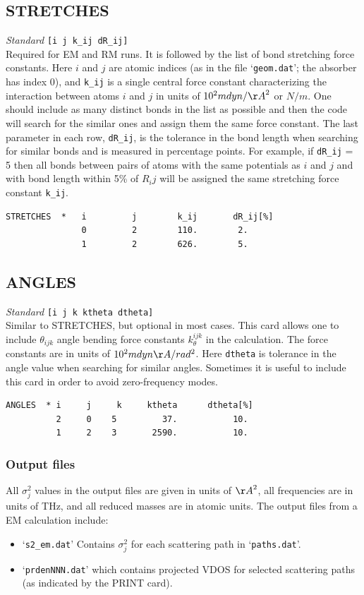 \documentclass[11pt,oneside]{report} %
\newenvironment{Card}[4]%
      {\vspace{3ex}%
        \subsection{#1}
        \quad\textsl{#3}\newline
        \quad\texttt{#2}\newline%
        \label{card:#4}\\}
      {}
\newcommand{\file}[1]{`\texttt{#1}'}
\begin{document}
\begin{Card}{STRETCHES}{[i   j   k\_ij   dR\_ij]}{Standard}{spring-stretches}
  Required for EM and RM runs.  It is followed by the list of bond stretching force constants.  Here $i$ and $j$ are atomic indices (as in the file \file{geom.dat}; the absorber has index 0), and \texttt{k\_ij} is a single central force constant characterizing the interaction between atoms $i$ and $j$ in units of $10^2 mdyn/{\AA}^2$ or $N/m$.  One should include as many distinct bonds in the list as possible and then the code will search for the similar ones and assign them the same force constant.  The last parameter in each row, \texttt{dR\_ij}, is the tolerance in the bond length when searching for similar bonds and is measured in percentage points.  For example, if \texttt{dR\_ij} = 5 then all bonds between pairs of atoms with the same potentials as $i$ and $j$ and with bond length within 5\% of $R_ij$ will be assigned the same stretching force constant \texttt{k\_ij}.
\begin{verbatim}
STRETCHES  *   i         j        k_ij       dR_ij[%]
               0         2        110.        2.
               1         2        626.        5.
\end{verbatim}
\end{Card}


\begin{Card}{ANGLES}{[i   j   k    ktheta   dtheta]}{Standard}{spring-angles}
  Similar to STRETCHES, but optional in most cases.  This card allows one to include $\theta_{ijk}$ angle bending force constants $k_{\theta}^{ijk}$ in the calculation.  The force constants are in units of $10^2 mdyn \AA / rad^2$.  Here \texttt{dtheta} is tolerance in the angle value when searching for similar angles.  Sometimes it is useful to include this card in order to avoid zero-frequency modes. 
\begin{verbatim}
ANGLES  * i     j     k     ktheta      dtheta[%]
          2     0    5         37.           10.
          1     2    3       2590.           10.
\end{verbatim}
\end{Card}


\subsubsection{Output files}
All $\sigma_j^2$ values in the output files are given in units of ${\AA}^2$, all frequencies are in units of THz, and all reduced masses are in atomic units.
The output files from a EM calculation include:
\begin{itemize}
\item \file{s2\_em.dat}  Contains $\sigma_j^2$ for each scattering path in \file{paths.dat}. 
\item \file{prdenNNN.dat} which contains projected VDOS for selected scattering paths (as indicated by the PRINT card).
\end{itemize}
\end{document}
